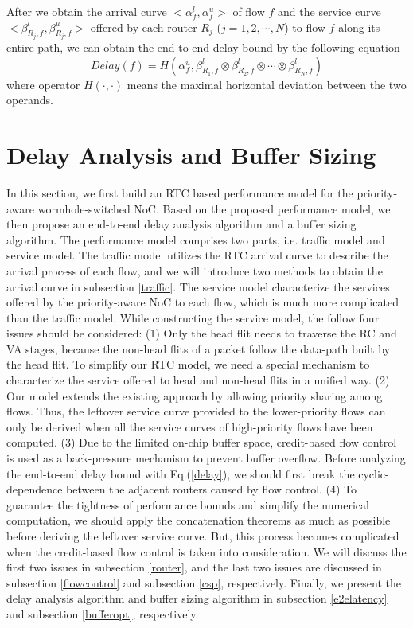 \documentclass[10pt,journal]{IEEEtran}
\begin{document}
After we obtain the arrival curve $<\alpha^l_{f},\alpha^u_{f}>$ of flow $f$ and the service curve $<\beta_{R_j,f}^l,\beta_{R_j,f}^u>$ offered by each router $R_j$ ($j=1,2,\cdots,N$) to flow $f$ along its entire path, we can obtain the end-to-end delay bound by the following equation \cite{Boudec2001Network}
\begin{equation}\label{delay}
Delay(f)=H(\alpha^u_{f},\beta^l_{R_1,f}\otimes\beta^l_{R_2,f}\otimes\cdots\otimes\beta^l_{R_N,f})
\end{equation}
where operator $H(\cdot,\cdot)$ means the maximal horizontal deviation between the two operands.

\section{Delay Analysis and Buffer Sizing}\label{modeling}
In this section, we first build an RTC based performance model for the priority-aware wormhole-switched NoC. Based on the proposed performance model, we then propose an end-to-end delay analysis algorithm and a buffer sizing algorithm. The performance model comprises two parts, i.e. traffic model and service model. The traffic model utilizes the RTC arrival curve to describe the arrival process of each flow, and we will introduce two methods to obtain the arrival curve in subsection \ref{traffic}. The service model characterize the services offered by the priority-aware NoC to each flow, which is much more complicated than the traffic model. While constructing the service model, the follow four issues should be considered: (1) Only the head flit needs to traverse the RC and VA stages, because the non-head flits of a packet follow the data-path built by the head flit. To simplify our RTC model, we need a special mechanism to characterize the service offered to head and non-head flits in a unified way. (2) Our model extends the existing approach \cite{73}\cite{Qian489900} by allowing priority sharing among flows. Thus, the leftover service curve provided to the lower-priority flows can only be derived when all the service curves of high-priority flows have been computed. (3) Due to the limited on-chip buffer space, credit-based flow control is used as a back-pressure mechanism to prevent buffer overflow. Before analyzing the end-to-end delay bound with Eq.(\ref{delay}), we should first break the cyclic-dependence between the adjacent routers caused by flow control. (4) To guarantee the tightness of performance bounds and simplify the numerical computation, we should apply the concatenation theorems as much as possible before deriving the leftover service curve. But, this process becomes complicated when the credit-based flow control is taken into consideration. We will discuss the first two issues in subsection \ref{router}, and the last two issues are discussed in subsection \ref{flowcontrol} and subsection \ref{csp}, respectively. Finally, we present the delay analysis algorithm and buffer sizing algorithm in subsection \ref{e2elatency} and subsection \ref{bufferopt}, respectively.
\end{document}
